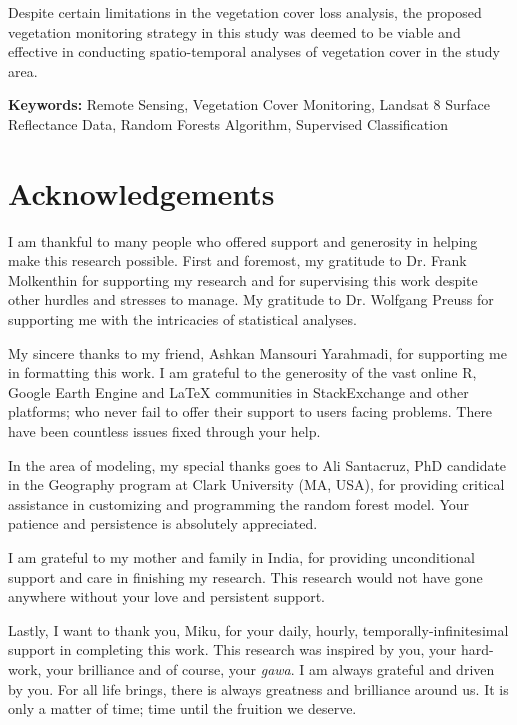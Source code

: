 \justify
Despite certain limitations in the vegetation cover loss analysis, the proposed vegetation monitoring strategy in this study was deemed to be viable and effective in conducting spatio-temporal analyses of vegetation cover in the study area. 

\justify
\textbf{Keywords:} Remote Sensing, Vegetation Cover Monitoring, Landsat 8 Surface Reflectance Data, Random Forests Algorithm, Supervised Classification

\clearpage

\section*{Acknowledgements}

\justify
I am thankful to many people who offered support and generosity in helping make this research possible. First and foremost, my gratitude to Dr. Frank Molkenthin for supporting my research and for supervising this work despite other hurdles and stresses to manage. My gratitude to Dr. Wolfgang Preuss for supporting me with the intricacies of statistical analyses. 

\justify
My sincere thanks to my friend, Ashkan Mansouri Yarahmadi, for supporting me in formatting this work. I am grateful to the generosity of the vast online R, Google Earth Engine and LaTeX communities in StackExchange and other platforms; who never fail to offer their support to users facing problems. There have been countless issues fixed through your help.

\justify
In the area of modeling, my special thanks goes to Ali Santacruz, PhD candidate in the Geography program at Clark University (MA, USA), for providing critical assistance in customizing and programming the random forest model. Your patience and persistence is absolutely appreciated.

\justify
I am grateful to my mother and family in India, for providing unconditional support and care in finishing my research. This research would not have gone anywhere without your love and persistent support.

\justify
Lastly, I want to thank you, Miku, for your daily, hourly, temporally-infinitesimal support in completing this work. This research was inspired by you, your hard-work, your brilliance and of course, your \textit{gawa}. I am always grateful and driven by you. For all life brings, there is always greatness and brilliance around us. It is only a matter of time; time until the fruition we deserve.